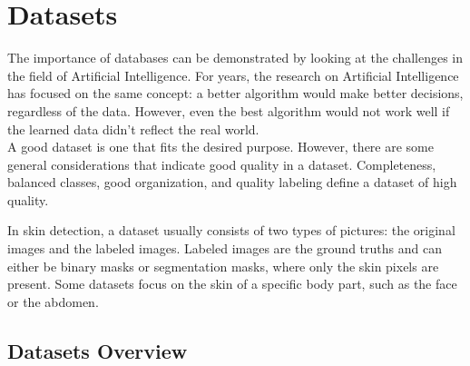 \chapter{Datasets}\label{chap:datasets}


\noindent The importance of databases can be demonstrated by looking at the challenges in the field of Artificial Intelligence.
For years, the research on Artificial Intelligence has focused on the same concept: a better algorithm would make better decisions, regardless of the data.
However, even the best algorithm would not work well if the learned data didn't reflect the real world.\\
A good dataset is one that fits the desired purpose.
However, there are some general considerations that indicate good quality in a dataset.
Completeness, balanced classes, good organization, and quality labeling define a dataset of high quality.

In skin detection, a dataset usually consists of two types of pictures: the original images and the labeled images.
Labeled images are the ground truths and can either be binary masks or segmentation masks, where only the skin pixels are present.
Some datasets focus on the skin of a specific body part, such as the face or the abdomen.


\section{Datasets Overview}


